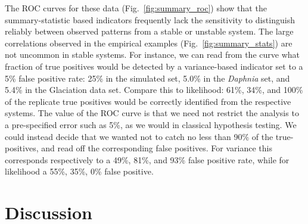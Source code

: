 \documentclass[authoryear,review,11pt]{elsarticle}
\newcommand{\cb}[1]{{\it (#1)}}
\begin{document}
 The ROC curves for these data (Fig.~\ref{fig:summary_roc}) show that the summary-statistic based indicators 
frequently lack the sensitivity to distinguish reliably between observed patterns from a stable or unstable system. 
The large correlations observed in the empirical examples (Fig.~\ref{fig:summary_stats}) are not uncommon in stable systems. 
For instance, we can read from the curve what fraction of true positives would be detected by a variance-based indicator
set to a 5\% false positive rate:
25\% in the simulated set,
5.0\% in the \emph{Daphnia} set,
and 5.4\% in the Glaciation data set.
Compare this to likelihood: 61\%, 34\%, and 100\% of the replicate true positives
would be correctly identified from the respective systems.
The value of the ROC curve is that we need not restrict the analysis to a pre-specified error such as 5\%,
as we would in classical hypothesis testing.  
We could instead decide that we wanted not to catch no less than 90\% of the true-positives,
and read off the corresponding false positives.  
For variance this corresponds respectively to a 49\%, 81\%, and 93\% false positive rate,
while for likelihood a 55\%, 35\%, 0\% false positive.



\section{Discussion}


\end{document}
